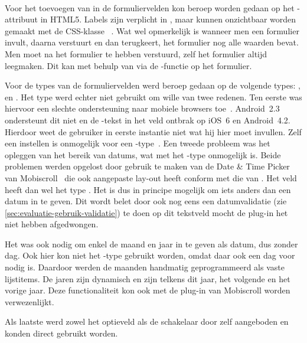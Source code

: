 \paragraph{\jqm} 
Voor het toevoegen van  in de formuliervelden kon beroep worden gedaan op het -attribuut in HTML5. 
Labels zijn verplicht in \jqm{}, maar kunnen onzichtbaar worden gemaakt met de CSS-klasse ~\cite{JQuery2013}. 
Wat wel opmerkelijk is wanneer men een formulier invult, daarna verstuurt en dan terugkeert, het formulier nog alle waarden bevat. 
Men moet na het formulier te hebben verstuurd, zelf het formulier altijd leegmaken. 
Dit kan met behulp van \js{} via de -functie op het formulier.
 
Voor de types van de formuliervelden werd beroep gedaan op de volgende types: ,  en . 
Het  type werd echter niet gebruikt om wille van twee redenen.
Ten eerste was hiervoor een slechte ondersteuning naar mobiele browsers toe~\cite{Deveria2013b}.
Android~2.3 ondersteunt dit niet en de -tekst in het veld ontbrak op iOS~6 en Android~4.2.
Hierdoor weet de gebruiker in eerste instantie niet wat hij hier moet invullen. 
Zelf een  instellen is onmogelijk voor een -type~\cite{Berjon2012}. 
Een tweede probleem was het opleggen van het bereik van datums, wat met het -type onmogelijk is. 
Beide problemen werden opgelost door gebruik te maken van de Date \& Time Picker van Mobiscroll~\cite{Mobiscroll2013} die ook aangepaste lay-out heeft conform met die van \jqm{}. 
Het veld heeft dan wel het type .
Het is dus in principe mogelijk om iets anders dan een datum in te geven. 
Dit wordt belet door ook nog eens een datumvalidatie (zie \ref{sec:evaluatie-gebruik-validatie}) te doen op dit tekstveld mocht de plug-in het niet hebben afgedwongen.
 
Het was ook nodig om enkel de maand en jaar in te geven als datum, dus zonder dag.
Ook hier kon niet het -type gebruikt worden, omdat daar ook een dag voor nodig is. 
Daardoor werden de maanden handmatig geprogrammeerd als vaste lijstitems. 
De jaren zijn dynamisch en zijn telkens dit jaar, het volgende en het vorige jaar. 
Deze functionaliteit kon ook met de plug-in van Mobiscroll worden verwezenlijkt.

Als laatste werd zowel het optieveld als de schakelaar door \jqm{} zelf aangeboden en konden direct gebruikt worden. 
 
